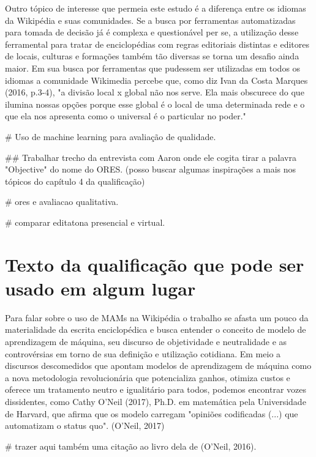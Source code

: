Outro tópico de interesse que permeia este estudo é a diferença entre os idiomas da Wikipédia e suas comunidades. Se a busca por ferramentas automatizadas para tomada de decisão já é complexa e questionável per se, a utilização desse ferramental para tratar de enciclopédias com regras editoriais distintas e editores de locais, culturas e formações também tão diversas se torna um desafio ainda maior. Em sua busca por ferramentas que pudessem ser utilizadas em todos os idiomas a comunidade Wikimedia percebe que, como diz Ivan da Costa Marques (2016, p.3-4), "a divisão local x global não nos serve. Ela mais obscurece do que ilumina nossas opções porque esse global é o local de uma determinada rede e o que ela nos apresenta como o universal é o particular no poder."

# Uso de machine learning para avaliação de qualidade.

## Trabalhar trecho da entrevista com Aaron onde ele cogita tirar a palavra "Objective" do nome do ORES. (posso buscar algumas inspirações a mais nos tópicos do capítulo 4 da qualificação)

# ores e avaliacao qualitativa.

# comparar editatona presencial e virtual.

\section{Texto da qualificação que pode ser usado em algum lugar}

Para falar sobre o uso de MAMs na Wikipédia o trabalho se afasta um pouco da materialidade da escrita enciclopédica e busca entender o conceito de modelo de aprendizagem de máquina, seu discurso de objetividade e neutralidade e as controvérsias em torno de sua definição e utilização cotidiana. Em meio a discursos descomedidos que apontam modelos de aprendizagem de máquina como a nova metodologia revolucionária que potencializa ganhos, otimiza custos e oferece um tratamento neutro e igualitário para todos, podemos encontrar vozes dissidentes, como Cathy O'Neil (2017), Ph.D. em matemática pela Universidade de Harvard, que afirma que os modelo carregam "opiniões codificadas (...) que automatizam o status quo". (O'Neil, 2017)

# trazer aqui também uma citação ao livro dela de (O'Neil, 2016).


